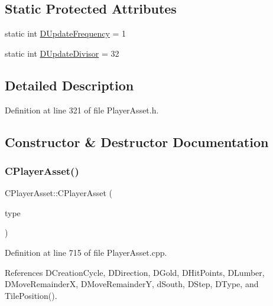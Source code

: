 \subsection*{Static Protected Attributes}
\begin{DoxyCompactItemize}
\item 
static int \hyperlink{classCPlayerAsset_ade2147d67ec25b0280d5f11a89dd0dc5}{D\+Update\+Frequency} = 1
\item 
static int \hyperlink{classCPlayerAsset_a09d17faf2ad70e2f778095a3c314d398}{D\+Update\+Divisor} = 32
\end{DoxyCompactItemize}


\subsection{Detailed Description}


Definition at line 321 of file Player\+Asset.\+h.



\subsection{Constructor \& Destructor Documentation}
\hypertarget{classCPlayerAsset_a84787ab2502e70d52c5b73b51ba9063a}{}\label{classCPlayerAsset_a84787ab2502e70d52c5b73b51ba9063a} 
\subsubsection{\texorpdfstring{C\+Player\+Asset()}{CPlayerAsset()}}
{\footnotesize\ttfamily C\+Player\+Asset\+::\+C\+Player\+Asset (\begin{DoxyParamCaption}\item[{std\+::shared\+\_\+ptr$<$ \hyperlink{classCPlayerAssetType}{C\+Player\+Asset\+Type} $>$}]{type }\end{DoxyParamCaption})}



Definition at line 715 of file Player\+Asset.\+cpp.



References D\+Creation\+Cycle, D\+Direction, D\+Gold, D\+Hit\+Points, D\+Lumber, D\+Move\+RemainderX, D\+Move\+RemainderY, d\+South, D\+Step, D\+Type, and Tile\+Position().


